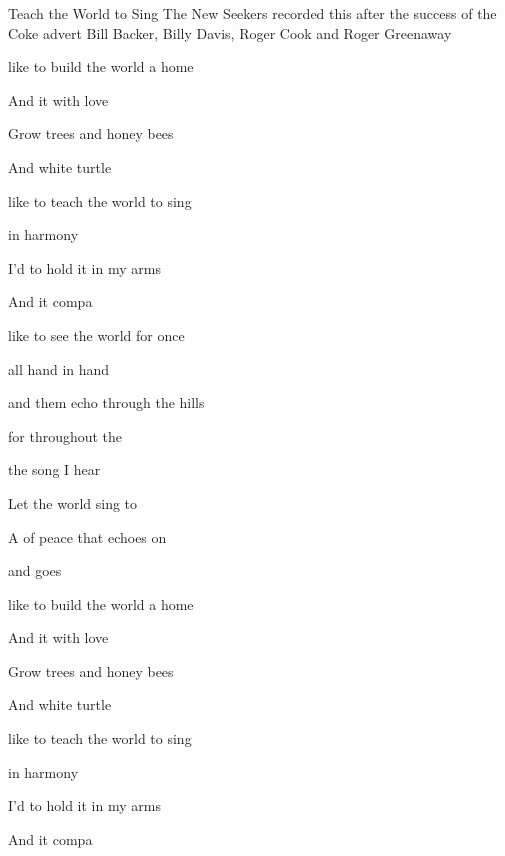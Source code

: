 \begin{SBSong}{Teach the World to Sing}
  {The New Seekers recorded this after the success of the Coke advert}
  {Bill Backer, Billy Davis, Roger Cook and Roger Greenaway}
  \begin{SBVerse}
     like to build the world a home
    
    And  it with love
    
    Grow  trees and honey bees
    
    And  white turtle 
  \end{SBVerse}
  \WBPageBrk
  \begin{SBVerse}
     like to teach the world to sing 
    
	in  harmony
	
	I'd  to hold it in my arms
	
	And  it compa
  \end{SBVerse}
  \begin{SBVerse}
     like to see the world for once
    
	all  hand in hand
	
	and  them echo through the hills
	
	for  throughout the 
  \end{SBVerse}
  \begin{SBVerse}
     the song I hear

    Let the world sing to

    A  of peace that echoes on 

    and  goes 
  \end{SBVerse}
  \begin{SBVerse}
     like to build the world a home
    
    And  it with love
    
    Grow  trees and honey bees
    
    And  white turtle 
  \end{SBVerse}
  \begin{SBVerse}
     like to teach the world to sing 
    
	in  harmony
	
	I'd  to hold it in my arms
	
	And  it compa
  \end{SBVerse}
\end{SBSong}
